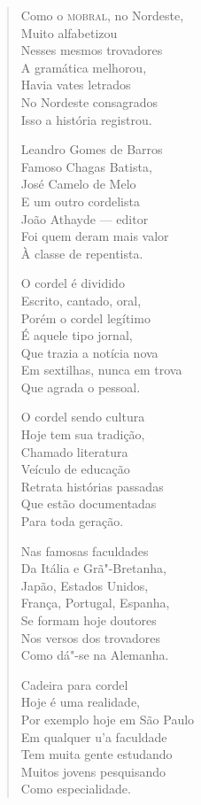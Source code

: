 \begin{verse}
Como o \textsc{mobral}, no Nordeste, \\
Muito alfabetizou \\
Nesses mesmos trovadores \\
A gramática melhorou, \\
Havia vates letrados \\
No Nordeste consagrados \\
Isso a história registrou. 
\pagebreak

Leandro Gomes de Barros \\
Famoso Chagas Batista, \\
José Camelo de Melo \\
E um outro cordelista \\
João Athayde ---  editor \\
Foi quem deram mais valor \\
À classe de repentista. 

O cordel é dividido \\
Escrito, cantado, oral, \\
Porém o cordel legítimo \\
É aquele tipo jornal, \\
Que trazia a notícia nova \\
Em sextilhas, nunca em trova \\
Que agrada o pessoal. 

O cordel sendo cultura \\
Hoje tem sua tradição, \\
Chamado literatura \\
Veículo de educação \\
Retrata histórias passadas \\
Que estão documentadas \\
Para toda geração. 

Nas famosas faculdades \\
Da Itália e Grã"-Bretanha, \\
Japão, Estados Unidos, \\
França, Portugal, Espanha, \\
Se formam hoje doutores \\
Nos versos dos trovadores \\
Como dá"-se na Alemanha. 
\pagebreak

Cadeira para cordel \\
Hoje é uma realidade, \\
Por exemplo hoje em São Paulo \\
Em qualquer u'a faculdade \\
Tem muita gente estudando \\
Muitos jovens pesquisando \\
Como especialidade. 


\end{verse}
